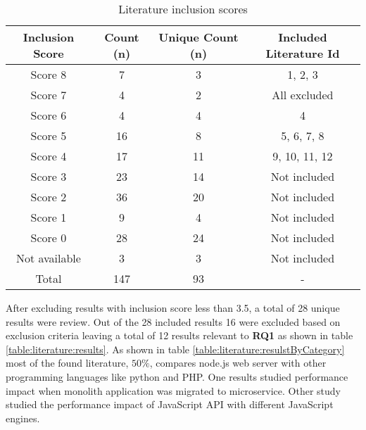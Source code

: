 \begin{table}[ht!]
    \begin{tabular}{|c c c c|} 
        \hline
        Inclusion Score
        & Count (n)
        & Unique Count (n)
        & Included Literature Id
        \\ 
        \hline\hline
        Score 8
        & 7
        & 3
        & 1, 2, 3
        \\ 
        \hline
        Score 7
        & 4
        & 2
        & All excluded
        \\ 
        \hline
        Score 6
        & 4
        & 4
        & 4
        \\ 
        \hline
        Score 5
        & 16
        & 8
        & 5, 6, 7, 8
        \\ 
        \hline
        Score 4
        & 17
        & 11
        & 9, 10, 11, 12
        \\ 
        \hline
        Score 3
        & 23
        & 14
        & Not included
        \\ 
        \hline
        Score 2
        & 36
        & 20
        & Not included
        \\ 
        \hline
        Score 1
        & 9
        & 4
        & Not included
        \\ 
        \hline
        Score 0
        & 28
        & 24
        & Not included
        \\ 
        \hline
        Not available
        & 3
        & 3
        & Not included
        \\ 
        \hline
        Total
        & 147
        & 93
        & -
        \\ 
        \hline
    \end{tabular}    
    \caption{Literature inclusion scores}
    \label{table:literature:inclusionResults}
\end{table}
After excluding results with inclusion score less than 3.5, a total of 28 unique results were review.
Out of the 28 included results 16 were excluded based on exclusion criteria leaving a total of 12 results relevant to \textbf{RQ1} as shown in table \ref{table:literature:results}.
As shown in table \ref{table:literature:resulstByCategory} most of the found literature, $50\%$, compares node.js web server with other programming languages like python and PHP.
One results studied performance impact when monolith application was migrated to microservice.
Other study studied the performance impact of JavaScript API with different JavaScript engines.

